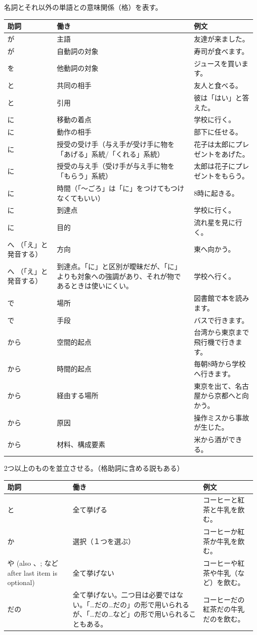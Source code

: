 \documentclass[a4paper,12pt]{article}
\begin{document}
名詞とそれ以外の単語との意味関係（格）を表す。
\begin{longtable}[c]{|C{0.15\textwidth}|C{0.35\textwidth}|C{0.35\textwidth}|}
\hline
助詞 & 働き & 例文 \\\hline\endhead
が & 主語 & 友達が来ました。 \\\hline
が & 自動詞の対象 & 寿司が食べます。 \\\hline
を & 他動詞の対象 & ジュースを買います。 \\\hline
と & 共同の相手 & 友人と食べる。 \\\hline
と & 引用 & 彼は「はい」と答えた。 \\\hline
に & 移動の着点 & 学校に行く。 \\\hline
に & 動作の相手 & 部下に任せる。 \\\hline
に & 授受の受け手（与え手が受け手に物を「あげる」系統/「くれる」系統） & 花子は太郎にプレゼントをあげた。 \\\hline
に & 授受の与え手（受け手が与え手に物を「もらう」系統） & 太郎は花子にプレゼントをもらう。 \\\hline
に & 時間（「〜ごろ」は「に」をつけてもつけなくてもいい） & 8時に起きる。 \\\hline
に & 到達点 & 学校に行く。 \\\hline
に & 目的 & 流れ星を見に行く。 \\\hline
へ （「え」と発音する） & 方向 & 東へ向かう。 \\\hline
へ （「え」と発音する） & 到達点。「に」と区別が曖昧だが、「に」よりも対象への強調があり、それが物であるときは使いにくい。 & 学校へ行く。 \\\hline
で & 場所 & 図書館で本を読みます。 \\\hline
で & 手段 & バスで行きます。 \\\hline
から & 空間的起点 & 台湾から東京まで飛行機で行きます。 \\\hline
から & 時間的起点 & 毎朝8時から学校へ行きます。 \\\hline
から & 経由する場所 & 東京を出て、名古屋から京都へと向かう。 \\\hline
から & 原因 & 操作ミスから事故が生じた。 \\\hline
から & 材料、構成要素 & 米から酒ができる。 \\\hline
\end{longtable}
2つ以上のものを並立させる。（格助詞に含める説もある）
\begin{longtable}[c]{|C{0.15\textwidth}|C{0.35\textwidth}|C{0.35\textwidth}|}
\hline
助詞 & 働き & 例文 \\\hline
と & 全て挙げる & コーヒーと紅茶と牛乳を飲む。 \\\hline
か & 選択（１つを選ぶ） & コーヒーか紅茶か牛乳を飲む。 \\\hline
や (also 、; など after last item is optional) & 全て挙げない & コーヒーや紅茶や牛乳（など）を飲む。 \\\hline
だの & 全て挙げない。二つ目は必要ではない。「…だの…だの」の形で用いられるが、「…だの…など」の形で用いられることもある。 & コーヒーだの紅茶だの牛乳だのを飲む。 \\\hline
\end{longtable}
\end{document}
